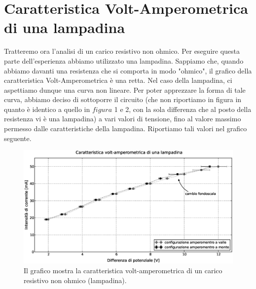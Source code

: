 \section{Caratteristica Volt-Amperometrica di una lampadina}
Tratteremo ora l'analisi di un carico resistivo non ohmico. Per eseguire questa parte dell'esperienza abbiamo utilizzato una lampadina. Sappiamo che, quando abbiamo davanti una resistenza che si comporta in modo "ohmico", il grafico della caratteristica Volt-Amperometrica è una retta. Nel caso della lampadina, ci aspettiamo dunque una curva non lineare. Per poter apprezzare la forma di tale curva, abbiamo deciso di sottoporre il circuito (che non riportiamo in figura in quanto è identico a quello in $figura$ 1 e 2, con la sola differenza che al posto della resistenza vi è una lampadina) a vari valori di tensione, fino al valore massimo permesso dalle caratteristiche della lampadina. Riportiamo tali valori nel grafico seguente.

\begin{figure}[t]
    \centering
        \includegraphics[width=\textwidth]{lamp.eps}
        \caption{Il grafico mostra la caratteristica volt-amperometrica di un carico resistivo non ohmico (lampadina).}
        \label{fig:lampadina}
\end{figure}